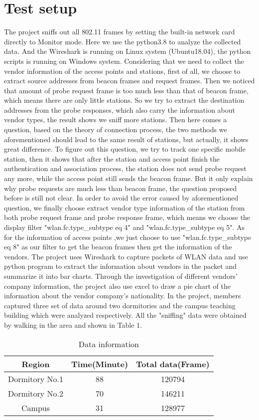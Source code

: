 \section{Test setup}
The project sniffs out all 802.11 frames by setting the built-in network card directly to Monitor mode. Here we use the python3.8 to analyze the collected data. And the Wireshark is running on Linux system (Ubuntu18.04), the python scripts is running on Windows system.
\newline
Considering that we need to collect the vendor information of the access points and stations, first of all, we choose to extract source addresses from beacon frames and request frames. Then we noticed that amount of probe request frame is too much less than that of beacon frame, which means there are only little stations. So we try to extract the destination addresses from the probe responses, which also carry the information about vendor types, the result shows we sniff more stations. Then here comes a question, based on the theory of connection process, the two methods we aforementioned should lead to the same result of stations, but actually, it shows great difference. To figure out this question, we try to track one specific mobile station, then it shows that after the station and access point finish the authentication and association process, the station does not send probe request any more, while the access point still sends the beacon frame. But it only explain why probe requests are much less than beacon frame, the question proposed before is still not clear.
\newline
In order to avoid the error caused by aforementioned question, we finally choose extract vendor type information of the station from both probe request frame and  probe response frame, which means we choose the display filter "wlan.fc.type\_subtype eq 4" and "wlan.fc.type\_subtype eq 5". As for the information of access points ,we just choose to use "wlan.fc.type\_subtype eq 8" as our filter to get the beacon frames then get the information of the vendors.
\newline
The project uses Wireshark to capture packets of WLAN data and use python program to extract the information about vendors in the packet and summarize it into bar charts. Through the investigation of different vendors' company information, the project also use excel to draw a pie chart of the information about the vendor company's nationality.
\newpage
In the project, members captured three set of data around two dormitories and the campus teaching building which were analyzed respectively. All the "sniffing" data were obtained by walking in the area and shown in Table 1.

\begin{table}[H]
\centering
\begin{tabular}{ccc}
\toprule  
Region & Time(Minute) & Total data(Frame)\\
\midrule  
Dormitory No.1 & 88 & 120794\\
Dormitory No.2 & 70 & 146211\\
Campus & 31 & 128977\\
\bottomrule 
\end{tabular}
\caption{Data information}\label{tab:aStrangeTable} 
\end{table}